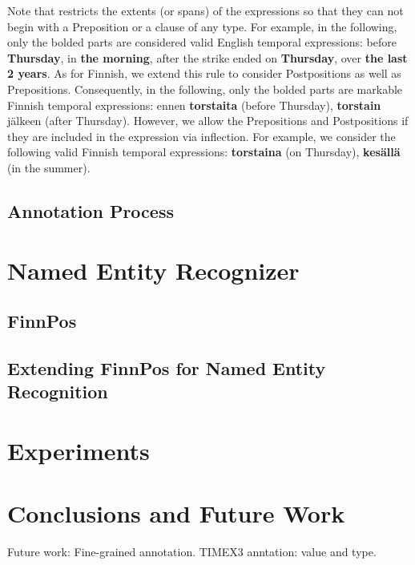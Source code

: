 \documentclass[11pt]{article}
\begin{document}

Note that \citet{verhagen2010} restricts the extents (or spans) of the expressions so that they can not begin with a Preposition or a clause of any type. For example, in the following, only the bolded parts are considered valid English temporal expressions: before \textbf{Thursday}, in \textbf{the morning}, after the strike ended on \textbf{Thursday}, over \textbf{the last 2 years}. As for Finnish, we extend this rule to consider Postpositions as well as Prepositions. Consequently, in the following, only the bolded parts are markable Finnish temporal expressions: ennen \textbf{torstaita} (before Thursday), \textbf{torstain} j\"alkeen (after Thursday). However, we allow the Prepositions and Postpositions if they are included in the expression via inflection. For example, we consider the following valid Finnish temporal expressions: \textbf{torstaina} (on Thursday), \textbf{kes\"all\"a} (in the summer).




\subsection{Annotation Process}





\section{Named Entity Recognizer}
\label{sec: named entity recognizer}


\subsection{FinnPos}



\subsection{Extending FinnPos for Named Entity Recognition}




\section{Experiments}
\label{sec: experiments}




\section{Conclusions and Future Work}
\label{sec: conclusions}


Future work: Fine-grained annotation. TIMEX3 anntation: value and type.



\newpage

%

\end{document}

